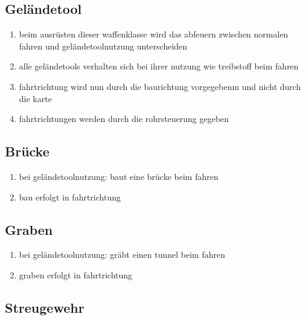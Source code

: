 \documentclass[10pt,a4paper,final]{scrartcl}
\newcommand{\ueberdenken}[1]{\colorbox{yellow}{\parbox{\textwidth}{??? #1}}}
\newcommand{\unwichtig}[1]{\textcolor{gray}{#1}}
\newcommand{\problem}{\colorbox{red}{\parbox{\widthof{A}}\#\#\#}}
\newcommand{\notiz}[1]{\textcolor{blue}{#1}}
\begin{document}
\subsection{Geländetool}
\begin{enumerate}
\item beim ausrüsten dieser waffenklasse wird das abfeuern zwischen normalen fahren und geländetoolnutzung unterscheiden
\item alle geländetools verhalten sich bei ihrer nutzung wie treibstoff beim fahren
\item fahrtrichtung wird nun durch die baurichtung vorgegebenm und nicht durch die karte
\item fahrtrichtungen werden durch die rohrsteuerung gegeben
\end{enumerate}

\subsection{Brücke}
\begin{enumerate}
\item bei geländetoolnutzung: baut eine brücke beim fahren
\item bau erfolgt in fahrtrichtung
\end{enumerate}

\subsection{Graben}
\begin{enumerate}
\item bei geländetoolnutzung: gräbt einen tunnel beim fahren
\item graben erfolgt in fahrtrichtung
\end{enumerate}

\subsection{Streugewehr}
\end{document}
